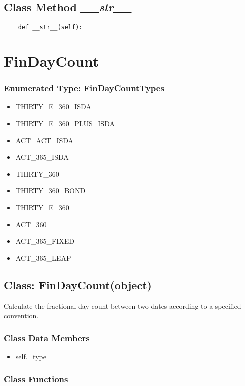 \documentclass[twoside,11pt]{book}
\begin{document}
\subsection{Class Method {\it \_\_str\_\_}}


\begin{lstlisting}
    def __str__(self):
\end{lstlisting}

\newpage
\section{FinDayCount}

\subsubsection{Enumerated Type: FinDayCountTypes}
\begin{itemize}
\item{THIRTY\_E\_360\_ISDA}
\item{THIRTY\_E\_360\_PLUS\_ISDA}
\item{ACT\_ACT\_ISDA}
\item{ACT\_365\_ISDA}
\item{THIRTY\_360}
\item{THIRTY\_360\_BOND}
\item{THIRTY\_E\_360}
\item{ACT\_360}
\item{ACT\_365\_FIXED}
\item{ACT\_365\_LEAP}
\end{itemize}

\subsection{Class: FinDayCount(object)}
Calculate the fractional day count between two dates according to a specified convention. 

\subsubsection{Class Data Members}
\begin{itemize}
\item{self.\_type}
\end{itemize}

\subsubsection{Class Functions}
\end{document}
